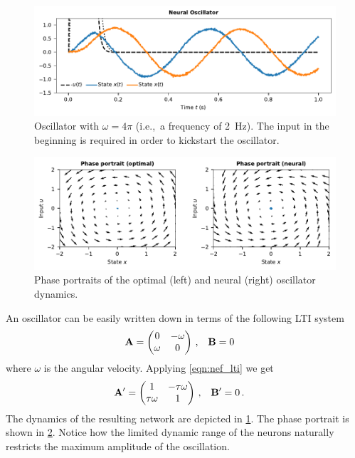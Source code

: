 \documentclass[10pt,letterpaper,oneside]{article}
\begin{document}
\begin{figure}
	\centering
	\includegraphics{media/example_oscillator.pdf}
	\caption{Oscillator with $\omega = 4\pi$ (i.e.,~a frequency of \SI{2}{\hertz}). The input in the beginning is required in order to kickstart the oscillator. }
	\label{fig:example_oscillator}
\end{figure}

\begin{figure}[t]
	\centering
	\includegraphics{media/example_oscillator_phases.pdf}
	\caption{Phase portraits of the optimal (left) and neural (right) oscillator dynamics. }
	\label{fig:example_oscillator_phases}
\end{figure}

An oscillator can be easily written down in terms of the following LTI system
\begin{align*}
	{\mathbf{A}} &= \begin{pmatrix}0 & -\omega \\ \omega & 0\end{pmatrix} \,, & {\mathbf{B}} &= 0
\end{align*}
where $\omega$ is the angular velocity. Applying \cref{eqn:nef_lti} we get
\begin{align*}
	{\mathbf{A}}' &= \begin{pmatrix}1 & -\tau\omega \\ \tau \omega & 1\end{pmatrix} \,,  & {\mathbf{B}}' &= 0 \,.
\end{align*}
The dynamics of the resulting network are depicted in \cref{fig:example_oscillator}. The phase portrait is shown in \cref{fig:example_oscillator_phases}. Notice how the limited dynamic range of the neurons naturally restricts the maximum amplitude of the oscillation.
\end{document}
